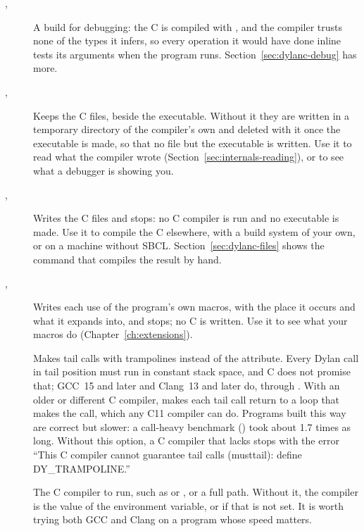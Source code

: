 \begin{description}
\item[, ]
  A build for debugging: the C is compiled with , and the compiler trusts none of the types it infers, so
  every operation it would have done inline tests its arguments when the
  program runs. Section~\ref{sec:dylanc-debug} has more.

\item[, ]
  Keeps the C files, beside the executable. Without it they are written
  in a temporary directory of the compiler's own and deleted with it once
  the executable is made, so that no file but the executable is written.
  Use it to read what the compiler wrote
  (Section~\ref{sec:internals-reading}), or to see what a debugger is
  showing you.

\item[, ]
  Writes the C files and stops: no C compiler is run and no executable is
  made. Use it to compile the C elsewhere, with a build system of your
  own, or on a machine without SBCL. Section~\ref{sec:dylanc-files}
  shows the command that compiles the result by hand.

\item[, ]
  Writes each use of the program's own macros, with the place it occurs
  and what it expands into, and stops; no C is written. Use it to see
  what your macros do (Chapter~\ref{ch:extensions}).

\item[] 
  Makes tail calls with trampolines instead of the 
  attribute. Every Dylan call in tail position must run in constant
  stack space, and C does not promise that; GCC~15 and later and Clang~13
  and later do, through . With an older or different C
  compiler,  makes each tail call return to a loop
  that makes the call, which any C11 compiler can do. Programs built this
  way are correct but slower: a call-heavy benchmark () took
  about 1.7 times as long. Without this option, a C compiler that lacks
   stops with the error ``This C compiler cannot guarantee
  tail calls (musttail): define DY\_TRAMPOLINE.''

\item[ ]
  The C compiler to run, such as  or , or a full path.
  Without it, the compiler is the value of the  environment
  variable, or  if that is not set. It is worth trying both GCC
  and Clang on a program whose speed matters.


\end{description}
